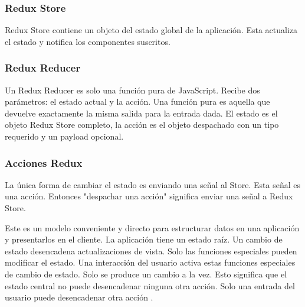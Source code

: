 \subsubsection{Redux Store}
Redux Store contiene un objeto del estado global de la aplicación. Esta actualiza el estado y notifica los componentes suscritos.
\vspace{0.8cm}



\subsubsection{Redux Reducer}
Un Redux Reducer es solo una función pura de JavaScript. Recibe dos parámetros: el estado actual y la acción. Una función pura es aquella que devuelve exactamente la misma salida para la entrada dada. El estado es el objeto Redux Store completo, la acción es el objeto despachado con un tipo requerido y un payload opcional.
\vspace{0.8cm}



\subsubsection{Acciones Redux}
La única forma de cambiar el estado es enviando una señal al Store. Esta señal es una acción. Entonces "despachar una acción" significa enviar una señal a Redux Store.
\vspace{0.8cm}



Este es un modelo conveniente y directo para estructurar datos en una aplicación y presentarlos en el cliente. La aplicación tiene un estado raíz. Un cambio de estado desencadena actualizaciones de vista. Solo las funciones especiales pueden modificar el estado. Una interacción del usuario activa estas funciones especiales de cambio de estado. Solo se produce un cambio a la vez. Esto significa que el estado central no puede desencadenar ninguna otra acción. Solo una entrada del usuario puede desencadenar otra acción \cite{mukhiya}.